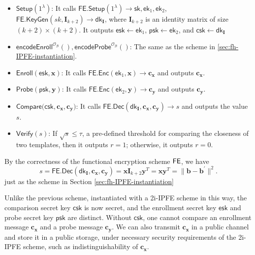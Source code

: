 \begin{itemize}

	\item $\textsf{Setup}(1^\lambda)$: It calls $\textsf{FE.Setup}(1^\lambda) \to \textsf{sk}, \textsf{ek}_1, \textsf{ek}_2$, $ \textsf{FE.KeyGen}(sk, \mathbf{I}_{k+2}) \to \textsf{dk}_{\mathbf{I}} $, where $\mathbf{I}_{k+2}$ is an identity matrix of size $(k+2) \times (k+2)$. It outputs $\textsf{esk} \gets \textsf{ek}_1$, $\textsf{psk} \gets \textsf{ek}_2$, and $\textsf{csk} \gets \textsf{dk}_{\mathbf{I}}$

	\item $\textsf{encodeEnroll}^{\mathcal{O}_{\mathcal{B}}}(), \textsf{encodeProbe}^{\mathcal{O}_{\mathcal{B}}}()$: The same as the scheme in \ref{sec:fh-IPFE-instantiation}. 

	\item $\textsf{Enroll}(\textsf{esk}, \mathbf{x})$: It calls $\textsf{FE.Enc}(\textsf{ek}_1, \mathbf{x}) \to \mathbf{c_x}$ and outputs $\mathbf{c_x}$.

	\item $\textsf{Probe}(\textsf{psk}, \mathbf{y})$: It calls $\textsf{FE.Enc}(\textsf{ek}_2, \mathbf{y}) \to \mathbf{c_y}$ and outputs $\mathbf{c_y}$.

	\item $\textsf{Compare}(\textsf{csk}, \mathbf{c_x}, \mathbf{c_y)}$: It calls $\textsf{FE.Dec}(\textsf{dk}_{\mathbf{I}}, \mathbf{c_x}, \mathbf{c_y}) \to s$ and outputs the value $s$.

	\item $\textsf{Verify}(s)$: If $\sqrt{s} \leq \tau$, a pre-defined threshold for comparing the closeness of two templates, then it outputs $r = 1$; otherwise, it outputs $r = 0$.

\end{itemize}

By the correctness of the functional encryption scheme $\sf FE$, we have
\[
	s = \textsf{FE.Dec}(\textsf{dk}_{\mathbf{I}}, \mathbf{c_x}, \mathbf{c_y}) =  \mathbf{x} \mathbf{I}_{k+2} \mathbf{y}^T = \mathbf{x} \mathbf{y}^T = \| \mathbf{b} - \mathbf{b}^\prime \|^2.
\]
just as the scheme in Section \ref{sec:fh-IPFE-instantiation}


Unlike the previous scheme, instantiated with a 2i-IPFE scheme in this way, the comparison secret key $\textsf{csk}$ is now secret, and the enrollment secret key $\textsf{esk}$ and probe secret key $\textsf{psk}$ are distinct. Without $\textsf{csk}$, one cannot compare an enrollment message $\mathbf{c_x}$ and a probe message $\mathbf{c_y}$. We can also transmit $\mathbf{c_x}$ in a public channel and store it in a public storage, under necessary security requirements of the 2i-IPFE scheme, such as indistinguishability of $\mathbf{c_x}$.


